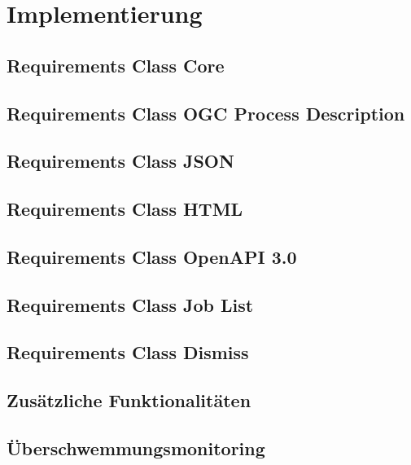 \newpage
\restoregeometry
\section{Implementierung}
\subsection{Requirements Class Core}
\subsection{Requirements Class OGC Process Description}
\subsection{Requirements Class JSON}
\subsection{Requirements Class HTML}
\subsection{Requirements Class OpenAPI 3.0}
\subsection{Requirements Class Job List}
\subsection{Requirements Class Dismiss}
\subsection{Zusätzliche Funktionalitäten}
\subsection{Überschwemmungsmonitoring}
